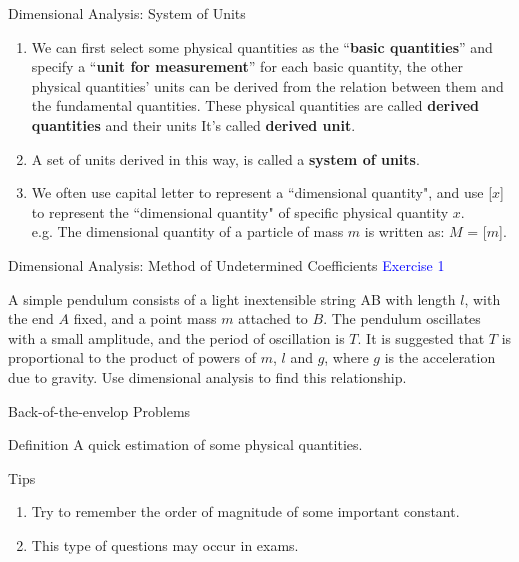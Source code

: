 \documentclass{beamer}
\begin{document}
\begin{frame}{Dimensional Analysis: System of Units}
\begin{enumerate}
  \item We can first select some physical quantities as the ``\textbf{basic quantities}”
  and specify a ``\textbf{unit for measurement}” for each basic quantity,
  the other physical quantities' units can be derived from the
  relation between them and the fundamental
  quantities. These physical quantities are called \textbf{derived quantities}
  and their units It's called \textbf{derived unit}.\pause
  \item A set of units derived in this way, is called a \textbf{system of units}.\pause
  \item We often use capital letter to represent a ``dimensional quantity", and
  use [$x$] to represent the ``dimensional quantity" of specific physical quantity $x$.\\
  e.g. The dimensional quantity of a particle of mass $m$ is written as: $M$ = [$m$].
\end{enumerate}
\end{frame}

\begin{frame}{Dimensional Analysis: Method of Undetermined Coefficients}
\textcolor{blue}{Exercise 1}

A simple pendulum consists of a light inextensible string AB with length $l$, with the end $A$ fixed, and a point mass $m$ attached to $B$. The pendulum oscillates with a small amplitude, and the period of oscillation is $T$. It is suggested that $T$ is proportional to the product of powers of $m$, $l$ and $g$, where $g$ is the acceleration due to gravity. Use dimensional analysis to find this relationship.
\end{frame}

\begin{frame}{Back-of-the-envelop Problems}
  \begin{block}{Definition}
    A quick estimation of some physical quantities.
  \end{block}
  \begin{block}{Tips}
    \begin{enumerate}
      \item Try to remember the order of magnitude of some important constant.
      \item This type of questions may occur in exams.
    \end{enumerate}
  \end{block}
\end{frame}
\end{document}

